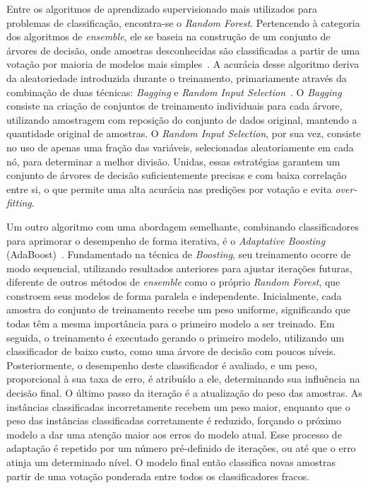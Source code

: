 Entre os algoritmos de aprendizado supervisionado mais utilizados para problemas de classificação, encontra-se o \textit{Random Forest}. Pertencendo à categoria dos algoritmos de \textit{ensemble}, ele se baseia na construção de um conjunto de árvores de decisão, onde amostras desconhecidas são classificadas a partir de uma votação por maioria de modelos mais simples~\cite{Tang2021}. A acurácia desse algoritmo deriva da aleatoriedade introduzida durante o treinamento, primariamente através da combinação de duas técnicas: \textit{Bagging} e \textit{Random Input Selection}~\cite{Breiman2001}. O \textit{Bagging} consiste na criação de conjuntos de treinamento individuais para cada árvore, utilizando amostragem com reposição do conjunto de dados original, mantendo a quantidade original de amostras. O \textit{Random Input Selection}, por sua vez, consiste no uso de apenas uma fração das variáveis, selecionadas aleatoriamente em cada nó, para determinar a melhor divisão. Unidas, essas estratégias garantem um conjunto de árvores de decisão suficientemente precisas e com baixa correlação entre si, o que permite uma alta acurácia nas predições por votação e evita \textit{over-fitting}.

Um outro algoritmo com uma abordagem semelhante, combinando classificadores para aprimorar o desempenho de forma iterativa, é o \textit{Adaptative Boosting} (AdaBoost)~\cite{Tang2021}. Fundamentado na técnica de \textit{Boosting}, seu treinamento ocorre de modo sequencial, utilizando resultados anteriores para ajustar iterações futuras, diferente de outros métodos de \textit{ensemble} como o próprio \textit{Random Forest}, que constroem seus modelos de forma paralela e independente. Inicialmente, cada amostra do conjunto de treinamento recebe um peso uniforme, significando que todas têm a mesma importância para o primeiro modelo a ser treinado. Em seguida, o treinamento é executado gerando o primeiro modelo, utilizando um classificador de baixo custo, como uma árvore de decisão com poucos níveis. Posteriormente, o desempenho deste classificador é avaliado, e um peso, proporcional à sua taxa de erro, é atribuído a ele, determinando sua influência na decisão final. O último passo da iteração é a atualização do peso das amostras. As instâncias classificadas incorretamente recebem um peso maior, enquanto que o peso das instâncias classificadas corretamente é reduzido, forçando o próximo modelo a dar uma atenção maior aos erros do modelo atual. Esse processo de adaptação é repetido por um número pré-definido de iterações, ou até que o erro atinja um determinado nível. O modelo final então classifica novas amostras partir de uma votação ponderada entre todos os classificadores fracos.


